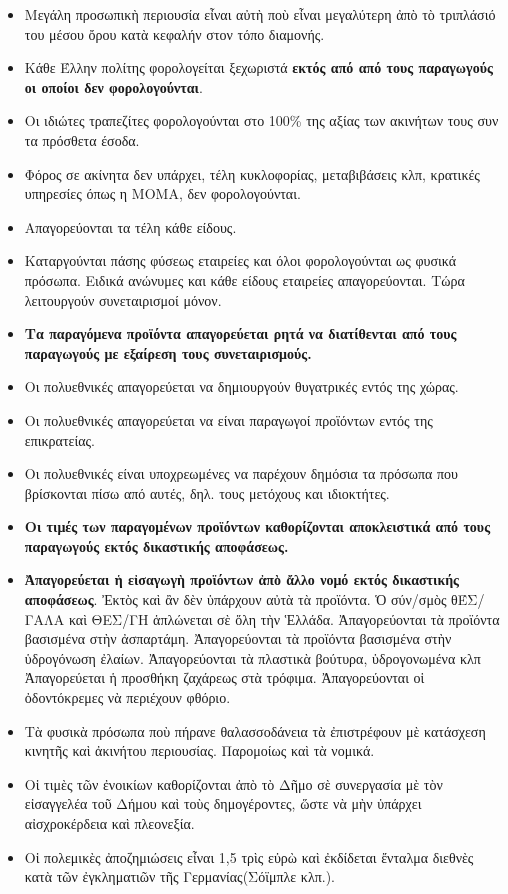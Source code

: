 \documentclass[a4paper]{article}
\begin{document}
\begin{itemize}
\item Μεγάλη προσωπικὴ περιουσία εἶναι αὐτὴ ποὺ εἶναι μεγαλύτερη ἀπὸ τὸ τριπλάσιό του μέσου ὄρου κατὰ κεφαλήν στον τόπο διαμονής.
\item Κάθε Έλλην πολίτης φορολογείται ξεχωριστά \textbf{εκτός από από τους παραγωγούς οι οποίοι δεν φορολογούνται}.
\item Οι ιδιώτες τραπεζίτες φορολογούνται στο 100\% της αξίας των ακινήτων τους συν τα πρόσθετα έσοδα.
\item Φόρος σε ακίνητα δεν υπάρχει, τέλη κυκλοφορίας, μεταβιβάσεις κλπ, κρατικές υπηρεσίες όπως η ΜΟΜΑ, δεν φορολογούνται. 
\item Απαγορεύονται τα τέλη κάθε είδους.
\item Καταργούνται πάσης φύσεως εταιρείες και όλοι φορολογούνται ως φυσικά πρόσωπα. Ειδικά ανώνυμες και κάθε είδους εταιρείες απαγορεύονται. Τώρα λειτουργούν συνεταιρισμοί μόνον.
\item \textbf{Τα παραγόμενα προϊόντα απαγορεύεται ρητά να διατίθενται από τους παραγωγούς με εξαίρεση τους συνεταιρισμούς.}
\item Οι πολυεθνικές απαγορεύεται να δημιουργούν θυγατρικές εντός της χώρας.
\item Οι πολυεθνικές απαγορεύεται να είναι παραγωγοί προϊόντων εντός της επικρατείας.
\item Οι πολυεθνικές είναι υποχρεωμένες να παρέχουν δημόσια τα πρόσωπα που βρίσκονται πίσω από αυτές, δηλ. τους μετόχους και ιδιοκτήτες.
\item \textbf{Οι τιμές των παραγομένων προϊόντων καθορίζονται αποκλειστικά από τους παραγωγούς εκτός δικαστικής αποφάσεως.}
\item \textbf{Ἀπαγορεύεται ἡ εἰσαγωγὴ προϊόντων ἀπὸ ἄλλο νομό εκτός δικαστικής αποφάσεως}. Ἐκτὸς καὶ ἂν δὲν ὑπάρχουν αὐτὰ τὰ προϊόντα. Ὁ σύν/σμὸς θΈΣ/ΓΑΛΑ καὶ ΘΕΣ/ΓΗ ἁπλώνεται σὲ ὅλη τὴν Ἑλλάδα. Ἀπαγορεύονται τὰ προϊόντα βασισμένα στὴν ἀσπαρτάμη. Ἀπαγορεύονται τὰ προϊόντα βασισμένα στὴν ὑδρογόνωση ἐλαίων. Ἀπαγορεύονται τὰ πλαστικὰ βούτυρα, ὑδρογονωμένα κλπ Ἀπαγορεύεται ἡ προσθήκη ζαχάρεως στὰ τρόφιμα. Ἀπαγορεύονται οἱ ὀδοντόκρεμες νὰ περιέχουν φθόριο. 
\item Τὰ φυσικὰ πρόσωπα ποὺ πήρανε θαλασσοδάνεια τὰ ἐπιστρέφουν μὲ κατάσχεση κινητῆς καὶ ἀκινήτου περιουσίας. Παρομοίως καὶ τὰ νομικά. 
\item Οἱ τιμὲς τῶν ἐνοικίων καθορίζονται ἀπὸ τὸ Δῆμο σὲ συνεργασία μὲ τὸν εἰσαγγελέα τοῦ Δήμου καὶ τοὺς δημογέροντες, ὥστε νὰ μὴν ὑπάρχει αἰσχροκέρδεια καὶ πλεονεξία.
\item Οἱ πολεμικὲς ἀποζημιώσεις εἶναι 1,5 τρὶς εὐρὼ καὶ ἐκδίδεται ἔνταλμα διεθνὲς κατὰ τῶν ἐγκληματιῶν τῆς Γερμανίας(Σόϊμπλε κλπ.).

\end{itemize}
\end{document}
